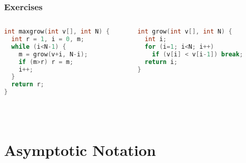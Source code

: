 \documentclass[aspectratio=169]{beamer}
\begin{document}
\begin{frame}[fragile]\frametitle{Exercises}
\begin{columns}
\begin{column}{0.48\textwidth}
\begin{lstlisting}[language=C++,emph={maxgrow,grow}]
int maxgrow(int v[], int N) {
  int r = 1, i = 0, m;
  while (i<N-1) {
    m = grow(v+i, N-i);
    if (m>r) r = m;
    i++;
  }
  return r;
}
\end{lstlisting}
\end{column}
\begin{column}{0.48\textwidth}
\begin{lstlisting}[language=C++,emph={grow}]
int grow(int v[], int N) {
  int i;
  for (i=1; i<N; i++)
    if (v[i] < v[i-1]) break;
  return i;
}



\end{lstlisting}
\end{column}
\end{columns}

~\\[-10mm]

\end{frame}


\section{Asymptotic Notation}

\end{document}
